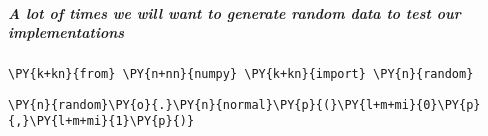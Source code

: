     \subparagraph{A lot of times we will want to generate random data to test our
implementations}



{\par%
\vspace{-1\baselineskip}%
}%
\begin{notebookcell}[32]%
\begin{addmargin}[\cellleftmargin]{0em}%
{\smaller%
\par%
%
\vspace{-1\smallerfontscale}%
\begin{Verbatim}[commandchars=\\\{\}]
\PY{k+kn}{from} \PY{n+nn}{numpy} \PY{k+kn}{import} \PY{n}{random}
\end{Verbatim}
%
\par%
\vspace{-1\smallerfontscale}}%
\end{addmargin}
\end{notebookcell}



{\par%
\vspace{-1\baselineskip}%
}%
\begin{notebookcell}[33]%
\begin{addmargin}[\cellleftmargin]{0em}%
{\smaller%
\par%
%
\vspace{-1\smallerfontscale}%
\begin{Verbatim}[commandchars=\\\{\}]
\PY{n}{random}\PY{o}{.}\PY{n}{normal}\PY{p}{(}\PY{l+m+mi}{0}\PY{p}{,}\PY{l+m+mi}{1}\PY{p}{)}
\end{Verbatim}
%
\par%
\vspace{-1\smallerfontscale}}%
\end{addmargin}
\end{notebookcell}

\par\vspace{1\smallerfontscale}%
    
